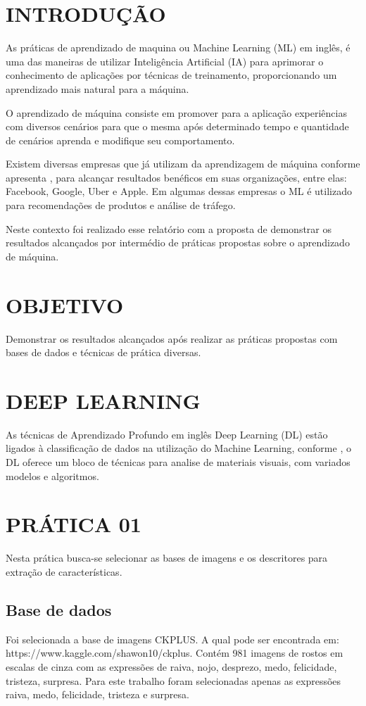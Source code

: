 \documentclass[a4paper, 12 pt, conference]{ieeeconf}  %
\begin{document}
\section{INTRODUÇÃO}
As práticas de aprendizado de maquina ou Machine Learning (ML) em inglês, é uma das maneiras de utilizar Inteligência Artificial (IA) para aprimorar o conhecimento de aplicações por técnicas de treinamento, proporcionando um aprendizado mais natural para a máquina.

O aprendizado de máquina consiste em promover para a aplicação experiências com diversos cenários para que o mesma após determinado tempo e quantidade de cenários aprenda e modifique seu comportamento.

Existem diversas empresas que já utilizam da aprendizagem de máquina conforme apresenta \cite{ray:2019}, para alcançar resultados benéficos em suas organizações, entre elas: Facebook, Google, Uber e Apple. Em algumas dessas empresas o ML é utilizado para recomendações de produtos e análise de tráfego.

Neste contexto foi realizado esse relatório com a proposta de demonstrar os resultados alcançados por intermédio de práticas propostas sobre o aprendizado de máquina.
\section{OBJETIVO}
Demonstrar os resultados alcançados após realizar as práticas propostas com bases de dados e técnicas de prática diversas.
\section{DEEP LEARNING}
As técnicas de Aprendizado Profundo em inglês Deep Learning (DL) estão ligados à classificação de dados na utilização do Machine Learning, conforme \cite{ponti:2017}, o DL oferece um bloco de técnicas para analise de materiais visuais, com variados modelos e algoritmos.

\section{PRÁTICA 01}
\label{pratica01}
Nesta prática busca-se selecionar as bases de imagens e os descritores para extração de características.

\subsection{Base de dados}
Foi selecionada a base de imagens CKPLUS. A qual pode ser encontrada em: https://www.kaggle.com/shawon10/ckplus. Contém 981 imagens de rostos em escalas de cinza com as expressões de raiva, nojo, desprezo, medo, felicidade, tristeza, surpresa. Para este trabalho foram selecionadas apenas as expressões raiva, medo, felicidade, tristeza e surpresa.
\end{document}
